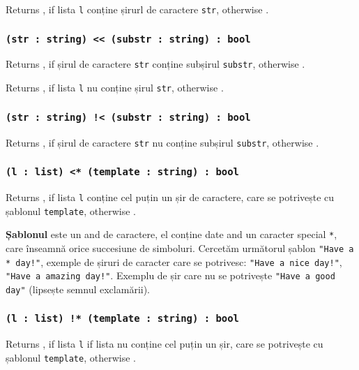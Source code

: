 Returns \true{}, if lista \texttt{l} conține șirurl de caractere \texttt{str}, otherwise \false{}.

\subsubsection{\texttt{(str : string) << (substr : string) : bool}}

Returns \true{}, if șirul de caractere \texttt{str} conține subșirul \texttt{substr}, otherwise \false{}.

Returns \true{}, if lista \texttt{l} nu conține șirul \texttt{str}, otherwise \false{}.

\subsubsection{\texttt{(str : string) !< (substr : string) : bool}}

Returns \true{}, if șirul de caractere \texttt{str} nu conține subșirul \texttt{substr}, otherwise \false{}.

\subsubsection{\texttt{(l : list) <* (template : string) : bool}}

Returns \true{}, if lista \texttt{l} conține cel puțin un șir de caractere, care se potrivește cu șablonul \texttt{template}, otherwise \false{}.

{\bf Șablonul} este un and de caractere, el conține date and un caracter special \texttt{*}, care înseamnă orice succesiune de simboluri. Cercetăm următorul șablon \texttt{"Have a * day!"}, exemple de șiruri de caracter care se potrivesc: \texttt{"Have a nice day!"}, \texttt{"Have a amazing day!"}. Exemplu de șir care nu se potrivește \texttt{"Have a good day"} (lipsește semnul exclamării).

\subsubsection{\texttt{(l : list) !* (template : string) : bool}}

Returns \true{}, if lista \texttt{l} if lista nu conține cel puțin un șir, care se potrivește cu șablonul \texttt{template}, otherwise \false{}.

